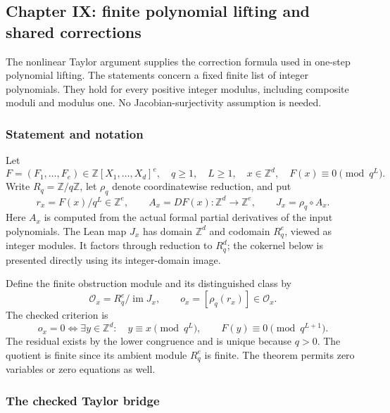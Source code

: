 \hypertarget{cont1:paper-ix-finite-polynomial-lifting-and-shared-corrections}{%
\subsection{Chapter IX: finite polynomial lifting and shared
corrections}\label{cont1:paper-ix-finite-polynomial-lifting-and-shared-corrections}}

The nonlinear Taylor argument supplies the correction formula used in
one-step polynomial lifting. The statements concern a fixed
finite list of integer polynomials. They hold for every positive integer
modulus, including composite moduli and modulus one. No
Jacobian-surjectivity assumption is needed.

\hypertarget{cont1:statement-and-notation}{%
\subsubsection{Statement and notation}\label{cont1:statement-and-notation}}

Let \[
F=(F_1,\ldots,F_e)\in\mathbb Z[X_1,\ldots,X_d]^e,
\quad q\ge1,\quad L\ge1,
\quad x\in\mathbb Z^d,
\quad F(x)\equiv0\pmod{q^L}.
\] Write \(R_q=\mathbb Z/q\mathbb Z\), let \(\rho_q\) denote
coordinatewise reduction, and put \[
r_x=F(x)/q^L\in\mathbb Z^e,
\qquad A_x=DF(x):\mathbb Z^d\longrightarrow\mathbb Z^e,
\qquad J_x=\rho_q\circ A_x.
\] Here \(A_x\) is computed from the actual formal partial derivatives
of the input polynomials. The Lean map \(J_x\) has domain
\(\mathbb Z^d\) and codomain \(R_q^e\), viewed as integer modules. It
factors through reduction to \(R_q^d\); the cokernel below is presented
directly using its integer-domain image.

Define the finite obstruction module and its distinguished class by \[
\mathcal O_x=R_q^e/\operatorname{im}J_x,
\qquad o_x=[\rho_q(r_x)]\in\mathcal O_x.
\] The checked criterion is \[
\boxed{
 o_x=0
 \iff
 \exists y\in\mathbb Z^d:\quad
 y\equiv x\pmod{q^L},\qquad F(y)\equiv0\pmod{q^{L+1}}.
}
\] The residual exists by the lower congruence and is unique because
\(q>0\). The quotient is finite since its ambient module \(R_q^e\) is
finite. The theorem permits zero variables or zero equations as well.

\hypertarget{cont1:the-checked-taylor-bridge}{%
\subsubsection{The checked Taylor
bridge}\label{cont1:the-checked-taylor-bridge}}

